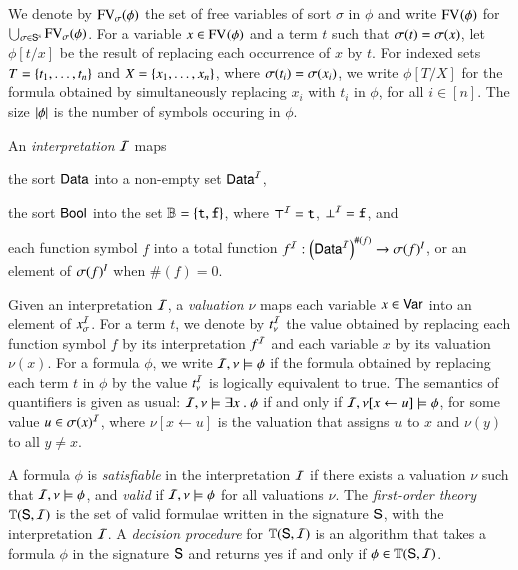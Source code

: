 \documentclass{llncs}
\begin{document}
We denote by $\mathrm{FV}_{\sigma}(\phi)$ the set of free variables of sort
$\sigma$ in $\phi$ and write $\mathrm{FV}_{}(\phi)$ for $\bigcup_{\sigma \in
  \mathsf{S}^\mathrm{s}} \mathrm{FV}_{\sigma}(\phi)$. For a variable $x \in
\mathrm{FV}_{}(\phi)$ and a term $t$ such that $\sigma({t}) = \sigma({x})$, let
$\phi[t/x]$ be the result of replacing each occurrence of $x$ by
$t$. For indexed sets $T=\{ t_1,\ldots,t_n \}$ and
$X=\{ x_1,\ldots,x_n \}$, where $\sigma({t_i}) = \sigma({x_i})$, we write
$\phi[T/X]$ for the formula obtained by simultaneously replacing $x_i$
with $t_i$ in $\phi$, for all $i\in[n]$. The size ${|{\phi}|}$ is the
number of symbols occuring in $\phi$.

An \emph{interpretation} $\mathcal{I}$ maps \begin{inparaenum}[(1)]
\item the sort $\mathsf{Data}$ into a non-empty set $\mathsf{Data}^{\mathcal{I}}$, 
%
\item the sort $\mathsf{Bool}$ into the set $\mathbb{B} = \{ \mathtt{t},\mathtt{f} \}$, where
  $\top^{\mathcal{I}} = \mathtt{t}$, $\bot^{\mathcal{I}} = \mathtt{f}$, and
%
\item each function symbol $f$ into a total function $f^{\mathcal{I}} :
  \left(\mathsf{Data}^{\mathcal{I}}\right)^{\#(f)} \rightarrow \sigma({f})^I$, or an element
  of $\sigma({f})^I$ when $\#(f)=0$.
\end{inparaenum}
Given an interpretation $\mathcal{I}$, a \emph{valuation} $\nu$ maps each
variable $x \in \mathsf{Var}$ into an element of $x_\sigma^{\mathcal{I}}$. For a term
$t$, we denote by $t^{\mathcal{I}}_\nu$ the value obtained by replacing each
function symbol $f$ by its interpretation $f^{\mathcal{I}}$ and each variable $x$
by its valuation $\nu(x)$. For a formula $\phi$, we write $\mathcal{I},\nu
\models \phi$ if the formula obtained by replacing each term $t$ in
$\phi$ by the value $t^{\mathcal{I}}_\nu$ is logically equivalent to true.  The
semantics of quantifiers is given as usual: $\mathcal{I},\nu \models \exists x
~.~ \phi$ if and only if $\mathcal{I},\nu[x \leftarrow u] \models \phi$, for
some value $u \in \sigma({x})^{\mathcal{I}}$, where $\nu[x \leftarrow u]$ is the
valuation that assigns $u$ to $x$ and $\nu(y)$ to all $y \neq x$.

A formula $\phi$ is \emph{satisfiable} in the interpretation $\mathcal{I}$ if
there exists a valuation $\nu$ such that $\mathcal{I},\nu \models \phi$, and
\emph{valid} if $\mathcal{I},\nu \models \phi$ for all valuations $\nu$.  The
\emph{first-order theory} $\mathbb{T}(\mathsf{S},\mathcal{I})$ is the set of valid
formulae written in the signature $\mathsf{S}$, with the interpretation
$\mathcal{I}$. A \emph{decision procedure} for $\mathbb{T}(\mathsf{S},\mathcal{I})$ is an
algorithm that takes a formula $\phi$ in the signature $\mathsf{S}$ and
returns yes if and only if $\phi \in \mathbb{T}(\mathsf{S},\mathcal{I})$.
\end{document}
